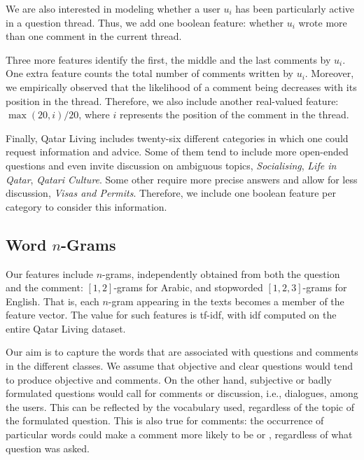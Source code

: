 We are also interested in modeling whether a user $u_i$ has been particularly 
active in a question thread. Thus, we add one boolean feature:
whether $u_i$ wrote more than one comment in the current thread.

Three more features 
identify the first, the middle and the last comments by $u_i$.
One extra feature counts the total number of comments written by $u_i$.
Moreover, we empirically observed 
that the likelihood of a comment being \good decreases with its position in the thread.
Therefore, we also include another real-valued feature: 
$\max(20, i)/20$, where $i$ represents the position of the comment in the thread.

Finally, Qatar Living includes twenty-six different categories in which one
could request information and advice. Some of them tend to include more 
open-ended questions and even invite discussion on ambiguous topics, \eg
\textit{Socialising}, \textit{Life in Qatar}, \textit{Qatari Culture}. Some other require more 
precise answers and allow for less discussion, \eg \textit{Visas and Permits}. 
Therefore, we include one boolean feature per category to consider this 
information. 
 
\subsection{Word $n$-Grams}
\label{ssub:ngrams}

Our features include $n$-grams, independently obtained from both the question and the comment:
$[1,2]$-grams for Arabic, and stopworded $[1,2,3]$-grams for English. That is, 
each $n$-gram appearing in the texts becomes a member of the feature vector. 
The value for such features is tf-idf, with idf computed on the entire Qatar Living dataset.

Our aim is to capture the words that are associated with questions and comments 
in the different classes. We assume that objective and clear questions would tend to produce objective and \good comments. On the other hand, subjective or badly formulated 
questions would call for \bad comments or discussion, i.e., dialogues, among 
the users. This can be reflected by the vocabulary used, regardless of the topic of the formulated question. This is also true for comments: the occurrence of particular words could make a comment more likely to be \good or \bad, regardless of what question was asked.
 
